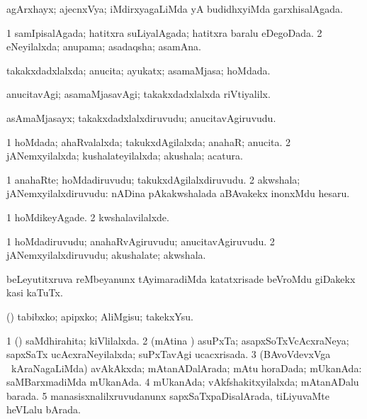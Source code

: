 \bentry
{}
\gl{\gu}
\bmng
agArxhayx; ajecnxVya; iMdirxyagaLiMda yA budidhxyiMda garxhisalAgada. 
\emng
\eentry

\bentry
{}
\gl{\gu}
\bmng
\bnum
\num{1} samIpisalAgada; hatitxra suLiyalAgada; hatitxra baralu eDegoDada. 
\num{2} eNeyilalxda; anupama; asadaqsha; asamAna. 
\enum
\emng
\eentry

\bentry
{}
\gl{\gu}
\bmng
takakxdadxlalxda; anucita; ayukatx; asamaMjasa; hoMdada. 
\emng
\eentry

\bentry
{}
\gl{\kirxvi}
\bmng
anucitavAgi; asamaMjasavAgi; takakxdadxlalxda riVtiyalilx. 
\emng
\eentry

\bentry
{}
\gl{\nA}
\bmng
asAmaMjasayx; takakxdadxlalxdiruvudu; anucitavAgiruvudu. 
\emng
\eentry

\bentry
{}
\gl{\gu}
\bmng
\bnum
\num{1} hoMdada; ahaRvalalxda; takukxdAgilalxda; anahaR; anucita. 
\num{2} jANemxyilalxda; kushalateyilalxda; akushala; acatura. 
\enum
\emng
\eentry

\bentry
{}
\gl{\nA}
\bmng
\bnum
\num{1} anahaRte; hoMdadiruvudu; takukxdAgilalxdiruvudu. 
\num{2} akwshala; jANemxyilalxdiruvudu:  nADina pAkakwshalada aBAvakekx inonxMdu hesaru. 
\enum
\emng
\eentry

\bentry
{}
\gl{\kirxvi}
\bmng
\bnum
\num{1} hoMdikeyAgade. 
\num{2} kwshalavilalxde. 
\enum
\emng
\eentry

\bentry
{}
\gl{\nA}
\bmng
\bnum
\num{1} hoMdadiruvudu; anahaRvAgiruvudu; anucitavAgiruvudu. 
\num{2} jANemxyilalxdiruvudu; akushalate; akwshala. 
\enum
\emng
\eentry

\bentry
{}
\gl{\sakirx}
\bmng
beLeyutitxruva reMbeyanunx tAyimaradiMda katatxrisade beVroMdu giDakekx kasi kaTuTx. 
\emng
\eentry

\bentry
{}
\gl{\sakirx}
\bmng
(\kAparx) tabibxko; apipxko; AliMgisu; takekxYsu. 
\emng
\eentry

\bentry
{}
\gl{\gu}
\bmng
\bnum
\num{1} (\jiVvi) saMdhirahita; kiVlilalxda. 
\num{2} (mAtina \vi) asuPxTa; asapxSoTxVcAcxraNeya; sapxSaTx ucAcxraNeyilalxda; suPxTavAgi ucacxrisada. 
\num{3} (BAvoVdevxVga \mo\ kAraNagaLiMda) avAkAkxda; mAtanADalArada; mAtu horaDada; mUkanAda:  saMBarxmadiMda mUkanAda. 
\num{4} mUkanAda; vAkfshakitxyilalxda; mAtanADalu barada. 
\num{5} manasisxnalilxruvudanunx sapxSaTxpaDisalArada, tiLiyuvaMte heVLalu bArada. 
\enum
\emng
\eentry


